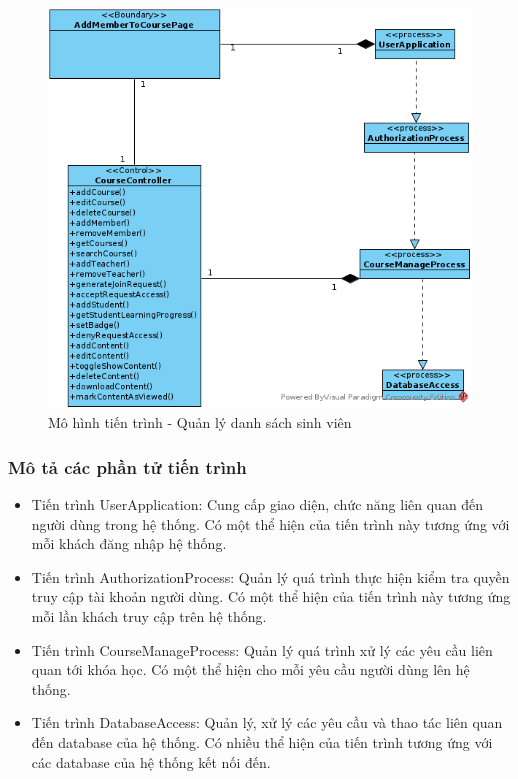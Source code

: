 \documentclass[./../main.tex]{subfiles}
\begin{document}
\begin{figure}[H]
	\centering
	\includegraphics[width=\linewidth]{./images/pv_add_course_member.png}
\caption{Mô hình tiến trình - Quản lý danh sách sinh viên}

\end{figure}

\subsubsection{Mô tả các phần tử tiến trình}
\begin{itemize}
	\item Tiến trình UserApplication: Cung cấp giao diện, chức năng liên quan đến người dùng trong hệ thống. Có một thể hiện của tiến trình này tương ứng với mỗi khách đăng nhập hệ thống.
	\item Tiến trình AuthorizationProcess: Quản lý quá trình thực hiện kiểm tra quyền truy cập tài khoản người dùng.
	Có một thể hiện của tiến trình này tương ứng mỗi lần khách truy cập trên hệ thống.
\item Tiến trình CourseManageProcess: Quản lý quá trình xử lý các yêu cầu liên quan tới khóa học.
	Có một thể hiện cho mỗi yêu cầu người dùng lên hệ thống.
	\item Tiến trình DatabaseAccess: Quản lý, xử lý các yêu cầu và thao tác liên quan đến database của hệ thống. Có nhiều thể hiện của tiến trình tương ứng với các database của hệ thống kết nối đến.
\end{itemize}
\end{document}
